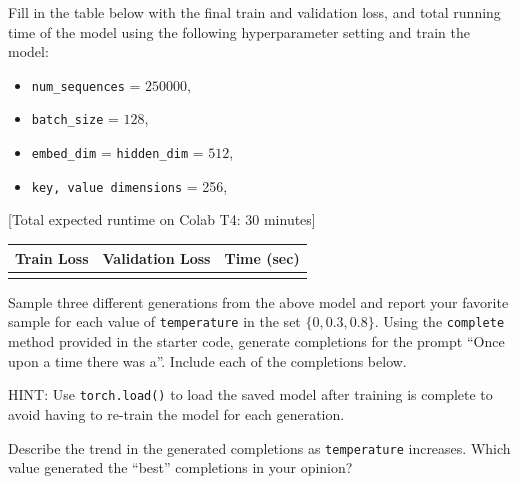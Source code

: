 \documentclass[11pt,addpoints,answers]{exam}
\begin{document}
\begin{questions}
\begin{parts}
\begin{subparts}
    \subpart[3] Fill in the table below with the final train and validation loss, and total running time of the model using the following hyperparameter setting and train the model:
    \begin{itemize}
        \item \texttt{num\_sequences} = $250000$,
        \item \texttt{batch\_size} = $128$,
        \item \texttt{embed\_dim} = \texttt{hidden\_dim} = $512$,
        \item \texttt{key, value dimensions} = 256,
    \end{itemize} 
    {[}Total expected runtime on Colab T4: 30 minutes{]}
    \begin{center}
        \begin{tabular}{c|c|c}
            \toprule
            {\bf Train Loss}   & {\bf Validation Loss} & {\bf Time (sec)} \\
            \midrule
                &   &   \\
            \bottomrule
        \end{tabular}
    \end{center} 
    


    \subpart[3] Sample three different generations from the above model and report your favorite sample for each value of \texttt{temperature} in the set $\{0, 0.3, 0.8\}$. Using the \texttt{complete} method provided in the starter code, generate completions for the prompt ``Once upon a time there was a''. Include each of the completions below. 

    HINT: Use \texttt{torch.load()} to load the saved model after training is complete to avoid having to re-train the model for each generation.
    
    \begin{your_solution}[title=\texttt{Temperature = 0}, height=3cm]
    \end{your_solution}
    
    \begin{your_solution}[title=\texttt{Temperature = 0.3}, height=3cm]
    \end{your_solution}
    
    \begin{your_solution}[title=\texttt{Temperature = 0.8}, height=3cm]
    \end{your_solution}


    \clearpage
    \subpart[1]Describe the trend in the generated completions as \texttt{temperature} increases. Which value generated the ``best'' completions in your opinion?

    \begin{your_solution}[height=4cm]
    \end{your_solution}
\end{subparts}

\end{parts}
    \newpage
    \end{questions}
\newpage
\end{document}
